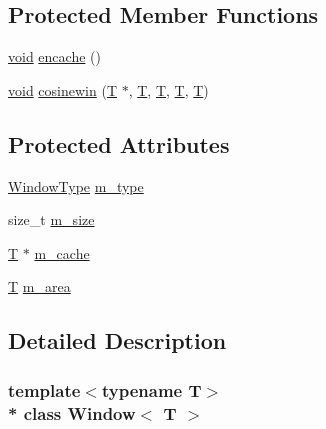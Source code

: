 \subsection*{Protected Member Functions}
\begin{DoxyCompactItemize}
\item 
\hyperlink{sound_8c_ae35f5844602719cf66324f4de2a658b3}{void} \hyperlink{class_window_a59a74dc73e3323734f437e076d4186ed}{encache} ()
\item 
\hyperlink{sound_8c_ae35f5844602719cf66324f4de2a658b3}{void} \hyperlink{class_window_a4dcb4756d4a1930f6eb8fb937d0282b9}{cosinewin} (\hyperlink{xmltchar_8h_a16a0f7e7053a679c9bf4289b441a2be7}{T} $\ast$, \hyperlink{xmltchar_8h_a16a0f7e7053a679c9bf4289b441a2be7}{T}, \hyperlink{xmltchar_8h_a16a0f7e7053a679c9bf4289b441a2be7}{T}, \hyperlink{xmltchar_8h_a16a0f7e7053a679c9bf4289b441a2be7}{T}, \hyperlink{xmltchar_8h_a16a0f7e7053a679c9bf4289b441a2be7}{T})
\end{DoxyCompactItemize}
\subsection*{Protected Attributes}
\begin{DoxyCompactItemize}
\item 
\hyperlink{class_window_af334e9ffc511fb6b24db90a1a5c56007}{Window\+Type} \hyperlink{class_window_a5bf6917099e3255f6c8d16207ad20270}{m\+\_\+type}
\item 
size\+\_\+t \hyperlink{class_window_ab6fe9d589ec181b7d0c10b673145e7e7}{m\+\_\+size}
\item 
\hyperlink{xmltchar_8h_a16a0f7e7053a679c9bf4289b441a2be7}{T} $\ast$ \hyperlink{class_window_a5ea309e48b295ae7fb3e2b9173949842}{m\+\_\+cache}
\item 
\hyperlink{xmltchar_8h_a16a0f7e7053a679c9bf4289b441a2be7}{T} \hyperlink{class_window_abd72b86265368a1b7ded9a846dcb9d0b}{m\+\_\+area}
\end{DoxyCompactItemize}


\subsection{Detailed Description}
\subsubsection*{template$<$typename T$>$\\*
class Window$<$ T $>$}



